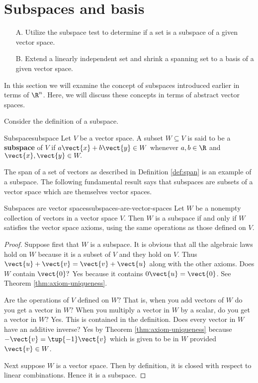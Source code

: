 \section{Subspaces and basis}

\begin{outcome}
\begin{enumerate}
\item[A.] Utilize the subspace test to determine if a set is a subspace of a given vector space.

\item[B.] Extend a linearly independent set and shrink a spanning set to a basis of a given vector space. 
\end{enumerate}
\end{outcome}

In this section we will examine the concept of subspaces introduced earlier in terms of $\R^n$. Here, we will discuss these concepts in terms of abstract vector spaces. 

Consider the definition of a subspace.

\begin{definition}{Subspace}{subspace}
Let $V$ be a vector space. A subset $W\subseteq V$ is said to be a \textbf{subspace} of $V$ if $a\vect{x}+b\vect{y}
\in W$ whenever $a,b\in \R$ and $\vect{x},\vect{y}\in W.$
\end{definition}

The span of a set of vectors as described in Definition \ref{def:span} is an example of a subspace. The following fundamental result says that subspaces are subsets of a
vector space which are themselves vector spaces.

\begin{theorem}{Subspaces are vector spaces}{subspaces-are-vector-spaces}
Let $W$ be a nonempty collection of vectors in a vector space $V$. Then $W$
is a subspace if and only if $W$ satisfies the vector space axioms, using the same
operations as those defined on $V$.
\end{theorem}

\begin{proof}
Suppose first that $W$ is a subspace. It is obvious that
all the algebraic laws hold on $W$ because it is a subset of $V$ and they
hold on $V$. Thus $\vect{u}+\vect{v}=\vect{v}+\vect{u}$ along with the other axioms. Does $W$
contain $\vect{0}?$ Yes because it contains $0\vect{u}=\vect{0}$. See
Theorem \ref{thm:axiom-uniqueness}.

 Are the operations of $V$ defined on $W?$ That is,
when you add vectors of $W$ do you get a vector in $W?$ When you multiply a
vector in $W$ by a scalar, do you get a vector in $W?$ Yes. This is
contained in the definition. Does every vector in $W$ have an additive
inverse? Yes by Theorem \ref{thm:axiom-uniqueness} because $-\vect{v}=\tup{
-1} \vect{v}$ which is given to be in $W$ provided $\vect{v}\in W$.

Next suppose $W$ is a vector space. Then by definition, it is closed with
respect to linear combinations. Hence it is a subspace. 
\end{proof}

